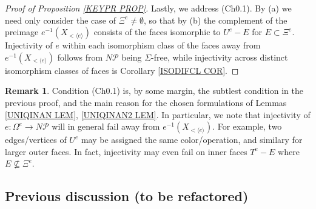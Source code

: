 \documentclass[a4paper,10pt
,draft
]{article}%
\numberwithin{equation}{section}
\numberwithin{figure}{section}
\theoremstyle{definition} %
\newtheorem{remark}[equation]{Remark}%
\newcommand{\1}{\ensuremath{\mathbbm 1}}%
\begin{document}
\begin{proof}[Proof of Proposition \ref{KEYPR PROP}]
	
	Lastly, we address (Ch0.1). By (a) we need only consider the case of $\Xi^e \neq \emptyset$,
	so that by (b)
	the complement of
	the preimage
	$e^{-1}(X_{<\langle e\rangle})$
	consists of the faces isomorphic to
	$U^e-E$ for $E \subset \Xi^e$.
	Injectivity of $e$ within each isomorphism class of the faces away from %
	$e^{-1}(X_{<\langle e\rangle})$
	follows from $N \mathcal{P}$ being $\Sigma$-free,
	while injectivity across distinct isomorphism classes of faces is
	Corollary \ref{ISODIFCL COR}.
\end{proof}




\begin{remark}
	Condition (Ch0.1) is, by some margin, the subtlest condition in the previous proof, and the main reason for the chosen formulations of 
	Lemmas \ref{UNIQINAN LEM}, \ref{UNIQINAN2 LEM}.
	In particular, we note that injectivity of 
	$e \colon \Omega^e \to N \mathcal{P}$ will in general fail away from 
	$e^{-1}(X_{< \langle e \rangle})$.
	For example, two edges/vertices of $U^e$
	may be assigned the same color/operation, and similary for larger outer faces. In fact, injectivity may even fail on inner faces
	$T^e-E$ where $E \not \subseteq \Xi^e$.
\end{remark}






\subsection{Previous discussion (to be refactored)}
\end{document}
